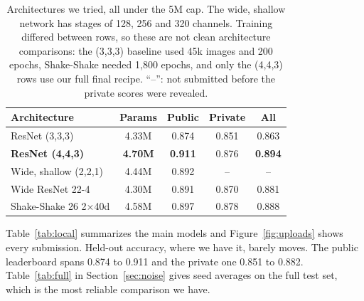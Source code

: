 \documentclass[letterpaper,10pt,twocolumn]{article}
\makeatletter
\renewcommand\section{\@startsection{section}{1}{\z@}{-1.6ex plus -.4ex}{0.8ex}{\normalfont\large\bfseries\centering}}
\makeatother
\begin{document}
\begin{table}[t]
\centering\small
\setlength{\tabcolsep}{3.5pt}
\begin{tabular}{lcccc}
\toprule
Architecture & Params & Public & Private & All \\
\midrule
ResNet (3,3,3) & 4.33M & 0.874 & 0.851 & 0.863 \\
\textbf{ResNet (4,4,3)} & \textbf{4.70M} & \textbf{0.911} & 0.876 & \textbf{0.894} \\
Wide, shallow (2,2,1) & 4.44M & 0.892 & -- & -- \\
Wide ResNet 22-4 & 4.30M & 0.891 & 0.870 & 0.881 \\
Shake-Shake 26 2$\times$40d & 4.58M & 0.897 & 0.878 & 0.888 \\
\bottomrule
\end{tabular}
\caption{Architectures we tried, all under the 5M cap. The wide, shallow network has stages of 128, 256 and 320 channels. Training differed between rows, so these are not clean architecture comparisons: the (3,3,3) baseline used 45k images and 200 epochs, Shake-Shake needed 1,800 epochs, and only the (4,4,3) rows use our full final recipe. ``--'': not submitted before the private scores were revealed.}
\label{tab:arch}
\end{table}

\section{Results}
Table~\ref{tab:local} summarizes the main models and Figure~\ref{fig:uploads} shows every submission. Held-out accuracy, where we have it, barely moves. The public leaderboard spans 0.874 to 0.911 and the private one 0.851 to 0.882. Table~\ref{tab:full} in Section~\ref{sec:noise} gives seed averages on the full test set, which is the most reliable comparison we have.
\end{document}
